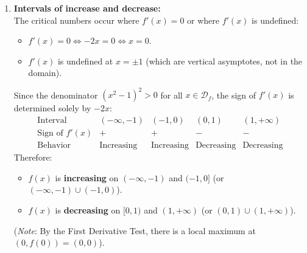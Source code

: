 \documentclass[11pt,a4paper]{article}
\begin{document}
\begin{enumerate}
\begin{enumerate}
          \item \textbf{Intervals of increase and decrease:}\\
                The critical numbers occur where $f'(x) = 0$ or where $f'(x)$ is undefined:
                \begin{itemize}
                  \item $f'(x) = 0 \iff -2x = 0 \iff x = 0$.
                  \item $f'(x)$ is undefined at $x = \pm 1$ (which are vertical asymptotes, not in the domain).
                \end{itemize}
                Since the denominator $(x^2 - 1)^2 > 0$ for all $x \in \mathcal{D}_f$, the sign of $f'(x)$ is determined solely by $-2x$:
                \[
                  \begin{array}{c|cccc}
                    \text{Interval}       & (-\infty, -1)     & (-1, 0)           & (0, 1)            & (1, +\infty)      \\ \hline
                    \text{Sign of } f'(x) & +                 & +                 & -                 & -                 \\
                    \text{Behavior}       & \text{Increasing} & \text{Increasing} & \text{Decreasing} & \text{Decreasing}
                  \end{array}
                \]
                Therefore:
                \begin{itemize}
                  \item $f(x)$ is \textbf{increasing} on $\boxed{(-\infty, -1)}$ and $\boxed{(-1, 0]}$ (or $(-\infty, -1) \cup (-1, 0)$).
                  \item $f(x)$ is \textbf{decreasing} on $\boxed{[0, 1)}$ and $\boxed{(1, +\infty)}$ (or $(0, 1) \cup (1, +\infty)$).
                \end{itemize}
                (\textit{Note}: By the First Derivative Test, there is a local maximum at $(0, f(0)) = (0, 0)$).


\end{enumerate}
\end{enumerate}
\end{document}
